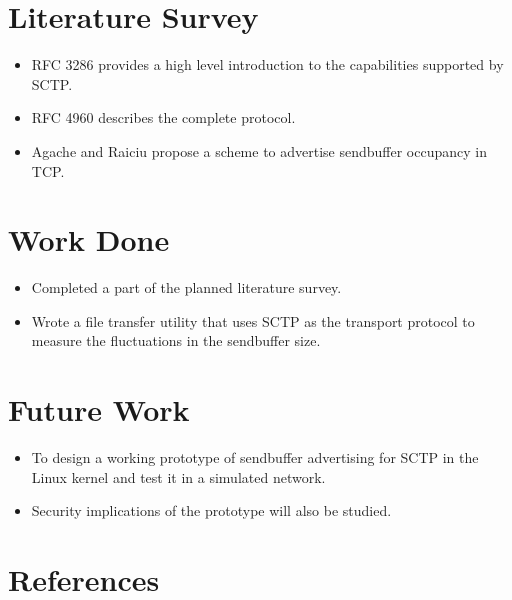 \documentclass{beamer}
\begin{document}
\section{Literature Survey}
\begin{frame}{\insertsection}
\begin{itemize}
	\item RFC 3286 \cite{rfc3286} provides a high level introduction to the
		capabilities supported by SCTP.
	\item RFC 4960 \cite{rfc4960} describes the complete protocol.
	\item Agache and Raiciu \cite{tcp-sndbufadv} propose a scheme to
		advertise sendbuffer occupancy in TCP.
\end{itemize}
\end{frame}

\section{Work Done}
\begin{frame}{\insertsection}
\begin{itemize}
	\item Completed a part of the planned literature survey.
	\item Wrote a file transfer utility that uses SCTP as the transport
		protocol to measure the fluctuations in the sendbuffer size.
\end{itemize}
\end{frame}

\section{Future Work}
\begin{frame}{\insertsection}
\begin{itemize}
	\item To design a working prototype of sendbuffer advertising for SCTP
		in the Linux kernel and test it in a simulated network.
	\item Security implications of the prototype will also be studied.
\end{itemize}
\end{frame}

\section{References}
\begin{frame}[allowframebreaks]
\frametitle<presentation>{\insertsection}
\printbibliography
\end{frame}
\end{document}
